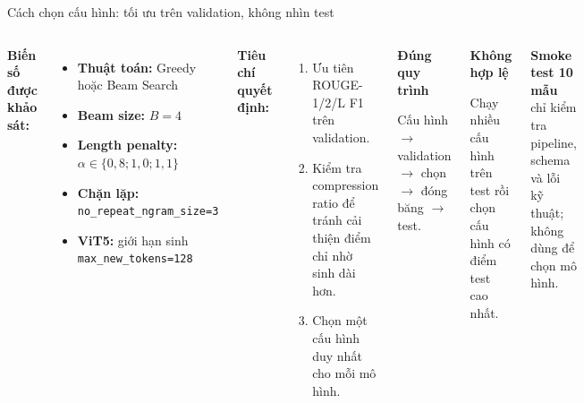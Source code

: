 \documentclass[aspectratio=169,10pt]{beamer}
\newcommand{\tightitems}{\setlength{\itemsep}{2.0pt}\setlength{\parskip}{0pt}}
\begin{document}
\begin{frame}{Cách chọn cấu hình: tối ưu trên validation, không nhìn test}
  \begin{columns}[T,onlytextwidth]
      \textbf{Biến số được khảo sát:}
      \begin{itemize}\small\tightitems
        \item \textbf{Thuật toán:} Greedy hoặc Beam Search
        \item \textbf{Beam size:} $B=4$
        \item \textbf{Length penalty:} $\alpha\in\{0{,}8;1{,}0;1{,}1\}$
        \item \textbf{Chặn lặp:} \texttt{no\_repeat\_ngram\_size=3}
        \item \textbf{ViT5:} giới hạn sinh \texttt{max\_new\_tokens=128}
      \end{itemize}
      \vspace{1mm}
      \textbf{Tiêu chí quyết định:}
      \begin{enumerate}\small\tightitems
        \item Ưu tiên ROUGE-1/2/L F1 trên validation.
        \item Kiểm tra compression ratio để tránh cải thiện điểm chỉ nhờ sinh dài hơn.
        \item Chọn một cấu hình duy nhất cho mỗi mô hình.
      \end{enumerate}
      \begin{greenbox}
        \small\textbf{Đúng quy trình}\par
        Cấu hình $\rightarrow$ validation $\rightarrow$ chọn $\rightarrow$ đóng băng $\rightarrow$ test.
      \end{greenbox}
      \vspace{2mm}
      \begin{tcolorbox}[colback=SoftRed,colframe=AccentRed,boxrule=.7pt,arc=1mm]
        \small\textbf{Không hợp lệ}\par
        Chạy nhiều cấu hình trên test rồi chọn cấu hình có điểm test cao nhất.
      \end{tcolorbox}
      \vspace{2mm}
      \begin{softbox}
        \scriptsize \textbf{Smoke test 10 mẫu} chỉ kiểm tra pipeline, schema và lỗi kỹ thuật; không dùng để chọn mô hình.
      \end{softbox}
  \end{columns}
\end{frame}
\end{document}
